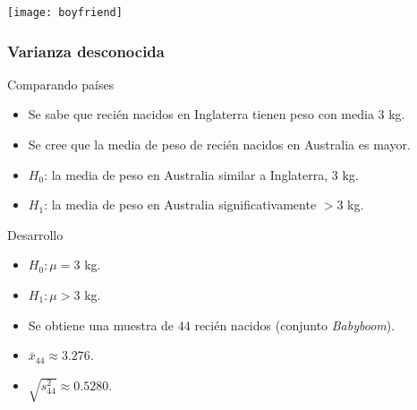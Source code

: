 \documentclass[table]{beamer}
\begin{document}
\begin{frame}
    \begin{center}
        \texttt{[image: boyfriend]}
    \end{center}
\end{frame}

\begin{frame}
    \frametitle{Varianza desconocida}
    \begin{exampleblock}{Comparando países}
        \begin{itemize}
            \item Se sabe que recién nacidos en Inglaterra tienen peso con media $3$ kg.
            \item Se cree que la media de peso de recién nacidos en Australia es mayor.
            \item $H_{0}$: la media de peso en Australia similar a Inglaterra, $3$ kg.
            \item $H_{1}$: la media de peso en Australia significativamente $>3$ kg.
        \end{itemize}
    \end{exampleblock}
    \begin{block}{Desarrollo}
        \begin{itemize}
            \item $H_{0}: \mu = 3$ kg.
            \item $H_{1}: \mu > 3$ kg.
            \item Se obtiene una muestra de $44$ recién nacidos (conjunto \emph{Babyboom}).
            \item $\bar{x}_{44} \approx 3.276$.
            \item $\sqrt{s^{2}_{44}} \approx 0.5280$.
        \end{itemize}
    \end{block}
\end{frame}
\end{document}
